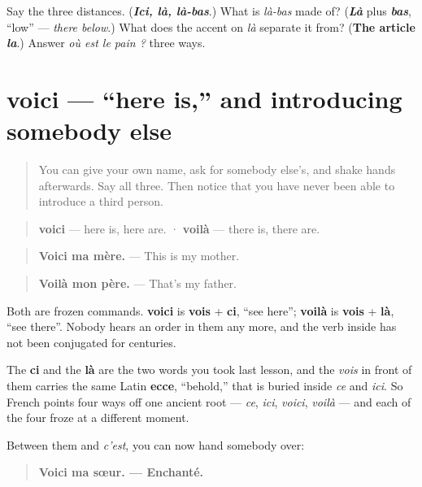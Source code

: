 \begin{tcolorbox}[breakable,colback=teal!4,colframe=teal!35!black,title={Before you move on}]
Say the three distances. (\emph{\textbf{Ici, là, là-bas}}.) What is \emph{là-bas} made of? (\emph{\textbf{Là}} plus \emph{\textbf{bas}}, \textquotedblleft{}low\textquotedblright{} — \emph{there below}.) What does the accent on \emph{là} separate it from? (\textbf{The article \emph{la}}.) Answer \emph{où est le pain ?} three ways.
\end{tcolorbox}
\section[voici]{voici — \textquotedblleft{}here is,\textquotedblright{} and introducing somebody else}

\label{lesson:FR-C34-voici}



\begin{quote}
You can give your own name, ask for somebody else's, and shake hands afterwards. Say all three. Then notice that you have never been able to introduce a third person.
\end{quote}

\begin{cousinweb}
\begin{quote}
\textbf{voici} — here is, here are. · \textbf{voilà} — there is, there are.
\end{quote}

\begin{quote}
\textbf{Voici ma mère.} — This is my mother.
\end{quote}

\begin{quote}
\textbf{Voilà mon père.} — That's my father.
\end{quote}

Both are frozen commands. \textbf{voici} is \textbf{vois} + \textbf{ci}, \textquotedblleft{}see here\textquotedblright{}; \textbf{voilà} is \textbf{vois} + \textbf{là}, \textquotedblleft{}see there\textquotedblright{}. Nobody hears an order in them any more, and the verb inside has not been conjugated for centuries.

The \textbf{ci} and the \textbf{là} are the two words you took last lesson, and the \emph{vois} in front of them carries the same Latin \textbf{ecce}, \textquotedblleft{}behold,\textquotedblright{} that is buried inside \emph{ce} and \emph{ici}. So French points four ways off one ancient root — \emph{ce}, \emph{ici}, \emph{voici}, \emph{voilà} — and each of the four froze at a different moment.

Between them and \emph{c'est}, you can now hand somebody over:

\begin{quote}
\textbf{Voici ma sœur. — Enchanté.}
\end{quote}
\end{cousinweb}


